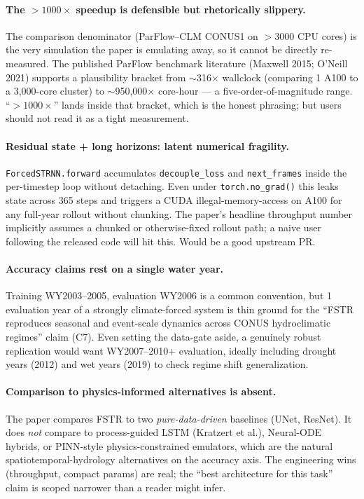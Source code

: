 \documentclass[11pt,letterpaper]{article}
\begin{document}
\paragraph{The ${>}1000\times$ speedup is defensible but rhetorically slippery.}
The comparison denominator (ParFlow--CLM CONUS1 on ${>}3000$ CPU cores) is the very simulation the paper is emulating away, so it cannot be directly re-measured. The published ParFlow benchmark literature (Maxwell 2015; O'Neill 2021) supports a plausibility bracket from $\sim$316$\times$ wallclock (comparing 1 A100 to a 3{,}000-core cluster) to $\sim$950{,}000$\times$ core-hour --- a five-order-of-magnitude range. ``${>}1000\times$'' lands inside that bracket, which is the honest phrasing; but users should not read it as a tight measurement.

\paragraph{Residual state + long horizons: latent numerical fragility.}
\texttt{ForcedSTRNN.forward} accumulates \texttt{decouple\_loss} and \texttt{next\_frames} inside the per-timestep loop without detaching. Even under \texttt{torch.no\_grad()} this leaks state across 365 steps and triggers a CUDA illegal-memory-access on A100 for any full-year rollout without chunking. The paper's headline throughput number implicitly assumes a chunked or otherwise-fixed rollout path; a naive user following the released code will hit this. Would be a good upstream PR.

\paragraph{Accuracy claims rest on a single water year.}
Training WY2003--2005, evaluation WY2006 is a common convention, but 1 evaluation year of a strongly climate-forced system is thin ground for the ``FSTR reproduces seasonal and event-scale dynamics across CONUS hydroclimatic regimes'' claim (C7). Even setting the data-gate aside, a genuinely robust replication would want WY2007--2010+ evaluation, ideally including drought years (2012) and wet years (2019) to check regime shift generalization.

\paragraph{Comparison to physics-informed alternatives is absent.}
The paper compares FSTR to two \emph{pure-data-driven} baselines (UNet, ResNet). It does \emph{not} compare to process-guided LSTM (Kratzert et al.), Neural-ODE hybrids, or PINN-style physics-constrained emulators, which are the natural spatiotemporal-hydrology alternatives on the accuracy axis. The engineering wins (throughput, compact params) are real; the ``best architecture for this task'' claim is scoped narrower than a reader might infer.
\end{document}
